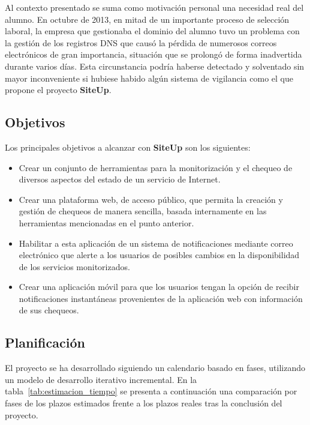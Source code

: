 \documentclass[a4paper,12pt]{article}
\begin{document}
Al contexto presentado se suma como motivación personal una necesidad real del
alumno. En octubre de 2013, en mitad de un importante proceso de selección
laboral, la empresa que gestionaba el dominio del alumno tuvo un problema con la
gestión de los registros DNS que causó la pérdida de numerosos correos
electrónicos de gran importancia, situación que se prolongó de forma inadvertida
durante varios días. Esta circunstancia podría haberse detectado y solventado
sin mayor inconveniente si hubiese habido algún sistema de vigilancia como el
que propone el proyecto \textbf{SiteUp}.

\subsection{Objetivos}
Los principales objetivos a alcanzar con \textbf{SiteUp} son los siguientes:


\begin{itemize}

\item Crear un conjunto de herramientas para la monitorización y el chequeo de
  diversos aspectos del estado de un servicio de Internet.
\item Crear una plataforma web, de acceso público, que permita la creación y
  gestión de chequeos de manera sencilla, basada internamente en las
  herramientas mencionadas en el punto anterior.
\item Habilitar a esta aplicación de un sistema de notificaciones mediante correo
  electrónico que alerte a los usuarios de posibles cambios en la disponibilidad
  de los servicios monitorizados.
\item Crear una aplicación móvil para que los usuarios tengan la opción de
  recibir notificaciones instantáneas provenientes de la aplicación web con
  información de sus chequeos.

\end{itemize}

\subsection{Planificación}
El proyecto se ha desarrollado siguiendo un calendario basado en fases,
utilizando un modelo de desarrollo iterativo incremental. En la
tabla~\ref{tab:estimacion_tiempo} se presenta a continuación una comparación por
fases de los plazos estimados frente a los plazos reales tras la conclusión del
proyecto.
\end{document}
